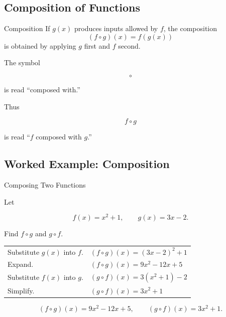 \subsection{Composition of Functions}
\label{subsec:analysis-composition}

\begin{definitionbox}{Composition}
If \(g(x)\) produces inputs allowed by \(f\), the composition
\[ (f\circ g)(x)=f(g(x)) \]
is obtained by applying \(g\) first and \(f\) second.
\end{definitionbox}

The symbol

\[ \circ \]

is read ``composed with.''

Thus

\[ f\circ g \]

is read ``\(f\) composed with \(g\).''

\subsection{Worked Example: Composition}
\label{subsec:worked-function-composition}

\begin{workedexamplebox}{Composing Two Functions}

Let

\[ f(x)=x^2+1,\qquad g(x)=3x-2. \]

Find \(f\circ g\) and \(g\circ f\).

\begin{tabularx}{\textwidth}{@{}>{\raggedright\arraybackslash}p{}X@{}}
Substitute \(g(x)\) into \(f\). &
\((f\circ g)(x)=(3x-2)^2+1\)\\
Expand. &
\((f\circ g)(x)=9x^2-12x+5\)\\[2mm]
Substitute \(f(x)\) into \(g\). &
\((g\circ f)(x)=3(x^2+1)-2\)\\
Simplify. &
\((g\circ f)(x)=3x^2+1\)
\end{tabularx}

\begin{answerbox}
\[ \boxed{(f\circ g)(x)=9x^2-12x+5,\qquad
(g\circ f)(x)=3x^2+1.} \]
\end{answerbox}
\end{workedexamplebox}

